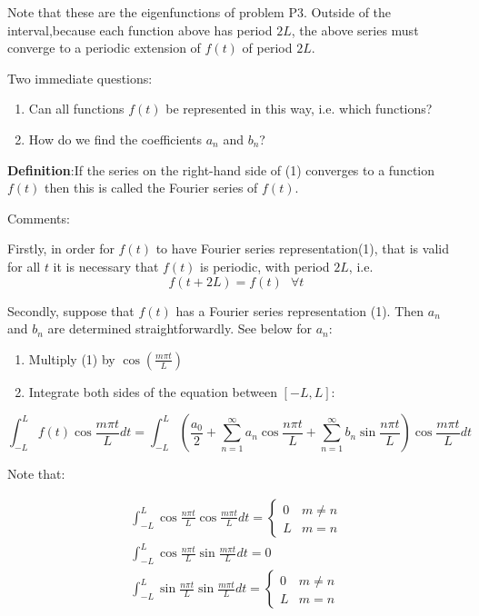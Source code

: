 Note that these are the eigenfunctions of problem P3. Outside of the interval,because each function above has period $2L$, the above series must converge to a periodic extension of $f(t)$ of period $2L$.

Two immediate questions:
\begin{enumerate}
    \item Can all functions $f(t)$ be represented in this way, i.e. which functions?
    \item How do we find the coefficients $a_n$ and $b_n$?
\end{enumerate}

\textbf{Definition}:If the series on the right-hand side of (1) converges to a function $f(t)$ then this is called the Fourier series of $f(t)$. 

\hfill

Comments:

Firstly, in order for $f(t)$ to have Fourier series representation(1), that is valid for all $t$ it is necessary that $f(t)$ is periodic, with period $2L$, i.e. $$f(t + 2L) = f(t) \text{     } \forall t$$

Secondly, suppose that $f(t)$ has a Fourier series representation (1). Then $a_n$ and $b_n$ are determined straightforwardly. See below for $a_n$:

\begin{enumerate}
    \item Multiply (1) by $\cos(\frac{m \pi t}{L})$
    \item Integrate both sides of the equation between $[-L, L]$:
\end{enumerate}

$$\int_{-L}^{L} f(t) \cos \frac{m \pi t}{L} d t=\int_{-L}^{L}\left(\frac{a_{0}}{2}+\sum_{n=1}^{\infty} a_{n} \cos \frac{n \pi t}{L}+\sum_{n=1}^{\infty} b_{n} \sin \frac{n \pi t}{L}\right) \cos \frac{m \pi t}{L} d t$$

Note that:

$$
\begin{array}{l}
\int_{-L}^{L} \cos \frac{n \pi t}{L} \cos \frac{m \pi t}{L} d t=\left\{\begin{array}{ll}
0 & m \neq n \\
L & m=n
\end{array}\right. \\
\int_{-L}^{L} \cos \frac{n \pi t}{L} \sin \frac{m \pi t}{L} d t=0 \\
\int_{-L}^{L} \sin \frac{n \pi t}{L} \sin \frac{m \pi t}{L} d t=\left\{\begin{array}{ll}
0 & m \neq n \\
L & m=n
\end{array}\right.
\end{array}
$$

